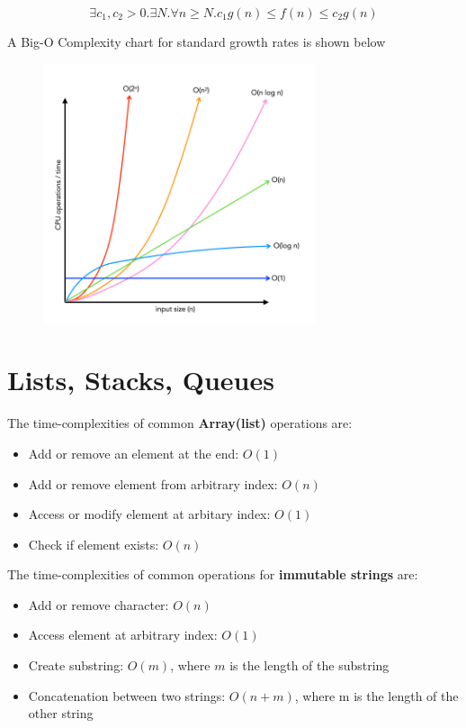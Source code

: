 \documentclass{article}
\begin{document}
$$\exists c_1, c_2 > 0. \exists N. \forall n \geq N. c_1g(n) \leq f(n) \leq c_2g(n)$$ \newline

A Big-O Complexity chart for standard growth rates is shown below

\begin{figure}[ht]
\includegraphics[width=8cm]{Big O complexity chart.png}
\centering
\end{figure}

\section{Lists, Stacks, Queues}

The time-complexities of common \textbf{Array(list)} operations are:
\begin{itemize}
    \item Add or remove an element at the end: $O(1)$
    \item Add or remove element from arbitrary index: $O(n)$
    \item Access or modify element at arbitary index: $O(1)$
    \item Check if element exists: $O(n)$
    
\end{itemize}

The time-complexities of common operations for \textbf{immutable strings} are:

\begin{itemize}
    \item Add or remove character: $O(n)$
    \item Access element at arbitrary index: $O(1)$
    \item Create substring: $O(m)$, where $m$ is the length of the substring
    \item Concatenation between two strings: $O(n+m)$, where m is the length of the other string
\end{itemize}
\end{document}
